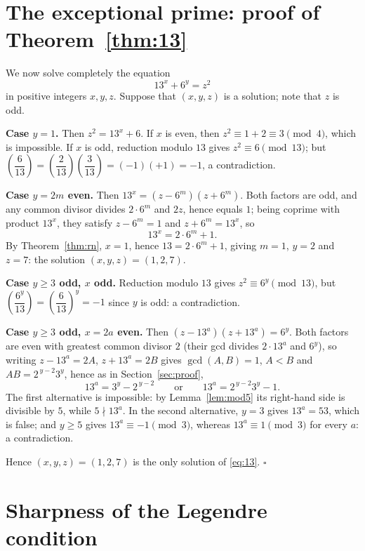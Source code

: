 \documentclass[preprint,12pt]{elsarticle}
\theoremstyle{definition}
\newcommand{\leg}[2]{\left(\dfrac{#1}{#2}\right)}
\begin{document}
\section{The exceptional prime: proof of Theorem~\ref{thm:13}}%
\label{sec:13}

We now solve completely the equation
\begin{equation}\label{eq:13}
13^{x}+6^{y}=z^{2}
\end{equation}
in positive integers $x,y,z$. Suppose that $(x,y,z)$ is a solution; note that
$z$ is odd.

\medskip
\noindent\textbf{Case $y=1$.} Then $z^{2}=13^{x}+6$. If $x$ is even, then
$z^{2}\equiv 1+2\equiv 3\pmod 4$, which is impossible. If $x$ is odd,
reduction modulo $13$ gives $z^{2}\equiv 6\pmod{13}$; but
$\leg{6}{13}=\leg{2}{13}\leg{3}{13}=(-1)(+1)=-1$, a contradiction.

\medskip
\noindent\textbf{Case $y=2m$ even.} Then
$13^{x}=(z-6^{m})(z+6^{m})$. Both factors are odd, and any common divisor
divides $2\cdot 6^{m}$ and $2z$, hence equals $1$; being coprime with product
$13^{x}$, they satisfy $z-6^{m}=1$ and $z+6^{m}=13^{x}$, so
\[
13^{x}=2\cdot 6^{m}+1.
\]
By Theorem~\ref{thm:rn}, $x=1$, hence $13=2\cdot 6^{m}+1$, giving $m=1$,
$y=2$ and $z=7$: the solution $(x,y,z)=(1,2,7)$.

\medskip
\noindent\textbf{Case $y\geq 3$ odd, $x$ odd.} Reduction modulo $13$ gives
$z^{2}\equiv 6^{y}\pmod{13}$, but
$\leg{6^{y}}{13}=\leg{6}{13}^{y}=-1$ since $y$ is odd: a contradiction.

\medskip
\noindent\textbf{Case $y\geq 3$ odd, $x=2a$ even.} Then
$(z-13^{a})(z+13^{a})=6^{y}$. Both factors are even with greatest common
divisor $2$ (their gcd divides $2\cdot 13^{a}$ and $6^{y}$), so writing
$z-13^{a}=2A$, $z+13^{a}=2B$ gives $\gcd(A,B)=1$, $A<B$ and
$AB=2^{\,y-2}3^{y}$, hence as in Section~\ref{sec:proof},
\[
13^{a}=3^{y}-2^{\,y-2}
\qquad\text{or}\qquad
13^{a}=2^{\,y-2}3^{y}-1.
\]
The first alternative is impossible: by Lemma~\ref{lem:mod5} its right-hand
side is divisible by $5$, while $5\nmid 13^{a}$. In the second alternative,
$y=3$ gives $13^{a}=53$, which is false; and $y\geq 5$ gives
$13^{a}\equiv -1\pmod 3$, whereas $13^{a}\equiv 1\pmod 3$ for every $a$: a
contradiction.

\medskip
Hence $(x,y,z)=(1,2,7)$ is the only solution of \eqref{eq:13}.
\hfill$\square$

\section{Sharpness of the Legendre condition}\label{sec:sharp}
\end{document}
